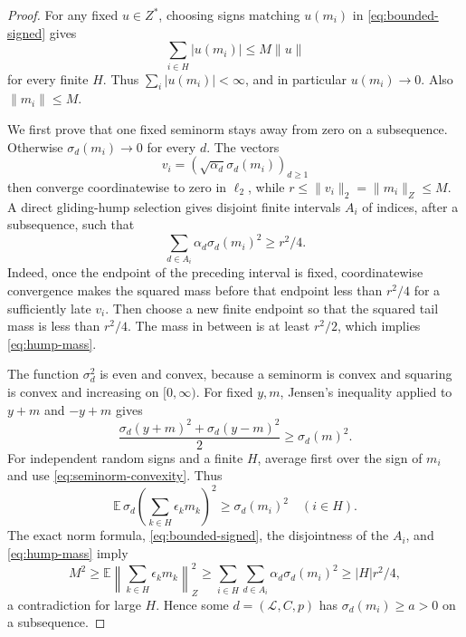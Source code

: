 \begin{proof}
For any fixed \(u\in Z^*\), choosing signs matching \(u(m_i)\) in
\eqref{eq:bounded-signed} gives
\[
                    \sum_{i\in H}|u(m_i)|\leq M\|u\|
\]
for every finite \(H\). Thus \(\sum_i|u(m_i)|<\infty\), and in
particular \(u(m_i)\to0\). Also \(\|m_i\|\leq M\).

We first prove that one fixed seminorm stays away from zero on a
subsequence. Otherwise \(\sigma_d(m_i)\to0\) for every \(d\).
The vectors
\[
               v_i=(\sqrt{\alpha_d}\sigma_d(m_i))_{d\geq1}
\]
then converge coordinatewise to zero in \(\ell_2\), while
\(r\leq\|v_i\|_2=\|m_i\|_Z\leq M\). A direct gliding-hump selection
gives disjoint finite intervals \(A_i\) of indices, after a
subsequence, such that
\begin{equation}
                 \sum_{d\in A_i}\alpha_d\sigma_d(m_i)^2
                            \geq r^2/4.                      \label{eq:hump-mass}
\end{equation}
Indeed, once the endpoint of the preceding interval is fixed,
coordinatewise convergence makes the squared mass before that
endpoint less than \(r^2/4\) for a sufficiently late \(v_i\).
Then choose a new finite endpoint so that the squared tail mass is
less than \(r^2/4\). The mass in between is at least \(r^2/2\),
which implies \eqref{eq:hump-mass}.

The function \(\sigma_d^2\) is even and convex, because a seminorm
is convex and squaring is convex and increasing on \([0,\infty)\).
For fixed \(y,m\),
Jensen's inequality applied to \(y+m\) and \(-y+m\) gives
\begin{equation}
       \frac{\sigma_d(y+m)^2+\sigma_d(y-m)^2}{2}
                        \geq\sigma_d(m)^2.                  \label{eq:seminorm-convexity}
\end{equation}
For independent random signs and a finite \(H\), average first over
the sign of \(m_i\) and use \eqref{eq:seminorm-convexity}. Thus
\[
 \mathbb E\,\sigma_d\!\left(\sum_{k\in H}\epsilon_km_k\right)^2
                         \geq\sigma_d(m_i)^2\quad(i\in H).
\]
The exact norm formula, \eqref{eq:bounded-signed}, the disjointness of the \(A_i\), and
\eqref{eq:hump-mass} imply
\[
 M^2\geq\mathbb E\left\|\sum_{k\in H}\epsilon_km_k\right\|_Z^2
 \geq\sum_{i\in H}\sum_{d\in A_i}\alpha_d\sigma_d(m_i)^2
 \geq |H|r^2/4,
\]
a contradiction for large \(H\). Hence some
\(d=(\mathcal L,C,p)\) has \(\sigma_d(m_i)\geq a>0\) on a subsequence.


\end{proof}
